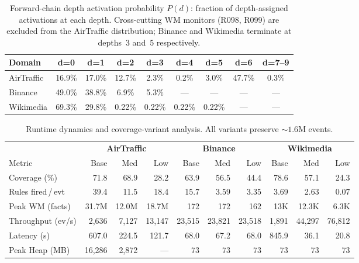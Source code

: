 \begin{table}[t]
\centering
\caption{Forward-chain depth activation probability $P(d)$: fraction of depth-assigned
activations at each depth. Cross-cutting WM monitors (R098, R099) are excluded from the
AirTraffic distribution; Binance and Wikimedia terminate at depths~3 and~5
respectively.}\label{tab:depth}
\small
\setlength{\tabcolsep}{4pt}
\begin{tabular}{@{}lcccccccc@{}}
\toprule
\textbf{Domain} & \textbf{d=0} & \textbf{d=1} & \textbf{d=2} & \textbf{d=3}
  & \textbf{d=4} & \textbf{d=5} & \textbf{d=6} & \textbf{d=7--9} \\
\midrule
AirTraffic & 16.9\% & 17.0\% & 12.7\% & 2.3\% & 0.2\% & 3.0\% & 47.7\% & 0.3\% \\
Binance    & 49.0\% & 38.8\% &  6.9\% & 5.3\% & ---   & ---   & ---    & ---   \\
Wikimedia  & 69.3\% & 29.8\% & 0.22\% & 0.22\%& 0.22\%& 0.22\%& ---    & ---   \\
\bottomrule
\end{tabular}
\end{table}

\begin{table}[t]
\caption{Runtime dynamics and coverage-variant analysis. All variants preserve ${\sim}1.6$M events.}\label{tab:runtime}\label{sec:coverage-analysis}
\centering
\small
\setlength{\tabcolsep}{3.5pt}
\begin{tabular}{l rrr rrr rrr}
\toprule
 & \multicolumn{3}{c}{\textbf{AirTraffic}}
 & \multicolumn{3}{c}{\textbf{Binance}}
 & \multicolumn{3}{c}{\textbf{Wikimedia}} \\
\cmidrule(lr){2-4} \cmidrule(lr){5-7} \cmidrule(lr){8-10}
Metric & Base & Med & Low & Base & Med & Low & Base & Med & Low \\
\midrule
Coverage (\%)       & 71.8 & 68.9 & 28.2 & 63.9 & 56.5 & 44.4 & 78.6 & 57.1 & 24.3 \\
Rules fired\,/\,evt & 39.4 & 11.5 & 18.4 & 15.7 & 3.59 & 3.35 & 3.69 & 2.63 & 0.07 \\
Peak WM (facts)     & 31.7M & 12.0M & 18.7M & 172 & 172 & 162 & 13K & 12.3K & 6.3K \\
Throughput (ev/s)   & 2,636 & 7,127 & 13,147 & 23,515 & 23,821 & 23,518 & 1,891 & 44,297 & 76,812 \\
Latency (s)         & 607.0 & 224.5 & 121.7 & 68.0 & 67.2 & 68.0 & 845.9 & 36.1 & 20.8 \\
Peak Heap (MB)      & 16,286 & 2,872 & {---} & 73 & 73 & 73 & 73 & 73 & 73 \\
\bottomrule
\end{tabular}
\end{table}

